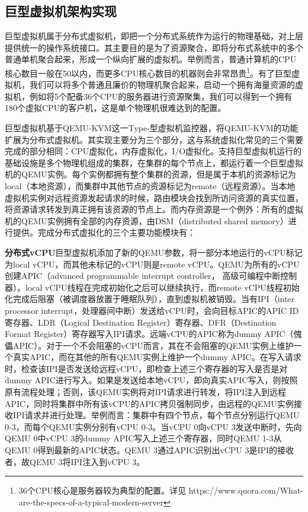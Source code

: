 \subsection{巨型虚拟机架构实现}
巨型虚拟机属于分布式虚拟机，即把一个分布式系统作为运行的物理基础，对上层提供统一的操作系统接口。其主要目的是为了资源聚合，即将分布式系统中的多个普通单机聚合起来，形成一个纵向扩展的虚拟机。举例而言，普通计算机的CPU核心数目一般在50以内，而更多CPU核心数目的机器则会非常昂贵\footnote{36个CPU核心是服务器较为典型的配置。详见 https://www.quora.com/What-are-the-specs-of-a-typical-modern-server}。有了巨型虚拟机，我们可以将多个普通且廉价的物理机聚合起来，启动一个拥有海量资源的虚拟机，例如将5个配备36个CPU的服务器进行资源聚集，我们可以得到一个拥有180个虚拟CPU的客户机，这是单个物理机很难达到的配置。

巨型虚拟机基于QEMU-KVM这一Type-\uppercase\expandafter{}型虚拟机监控器，将QEMU-KVM的功能扩展为分布式虚拟机。其实现主要分为三个部分，这与系统虚拟化常见的三个需要完成的部分相同：CPU虚拟化，内存虚拟化，I/O虚拟化。支持巨型虚拟机运行的基础设施是多个物理机组成的集群，在集群的每个节点上，都运行着一个巨型虚拟机的QEMU实例。每个实例都拥有整个集群的资源，但是属于本机的资源标记为local（本地资源），而集群中其他节点的资源标记为remote（远程资源）。当本地虚拟机实例对远程资源发起请求的时候，路由模块会找到所访问资源的真实位置，将资源请求转发到真正拥有该资源的节点上。而内存资源是一个例外：所有的虚拟机的QEMU实例拥有全部的内存资源，由DSM（distributed shared memory）进行提供。完成分布式虚拟化的三个主要功能模块有：


\noindent\textbf{分布式vCPU}\quad 巨型虚拟机添加了新的QEMU参数，将一部分本地运行的vCPU标记为local vCPU，而其他未标记的vCPU则是remote vCPU。QEMU为所有的vCPU创建APIC（advanced programmable interrupt controller， 高级可编程中断控制器）。local vCPU线程在完成初始化之后可以继续执行，而remote vCPU线程初始化完成后阻塞（被调度器放置于睡眠队列），直到虚拟机被销毁。当有IPI（inter processor interrupt，处理器间中断）发送给vCPU时，会向目标APIC的APIC ID寄存器、LDR（Logical Destination Register）寄存器、DFR（Destination Format Register）寄存器写入IPI请求。远端vCPU的APIC称为dummy APIC（傀儡APIC）。对于一个不会阻塞的vCPU而言，其在不会阻塞的QEMU实例上维护一个真实APIC，而在其他的所有QEMU实例上维护一个dummy APIC。在写入请求时，检查该IPI是否发送给远程vCPU，即检查上述三个寄存器的写入是否是对dummy APIC进行写入。如果是发送给本地vCPU，即向真实APIC写入，则按照原有流程处理；否则，该QEMU实例将对IPI请求进行转发，将IPI注入到远程APIC，同时将集群中所有该vCPU的APIC拷贝强制同步，由远程的QEMU实例接收IPI请求并进行处理。举例而言：集群中有四个节点，每个节点分别运行QEMU 0-3，而每个QEMU实例分别有vCPU 0-3。当vCPU 0向vCPU 3发送中断时，先向QEMU 0中vCPU 3的dummy APIC写入上述三个寄存器，同时QEMU 1-3从QEMU 0得到最新的APIC状态。QEMU 3通过APIC识别出vCPU 3是IPI的接收者，故QEMU 3将IPI注入到vCPU 3。

